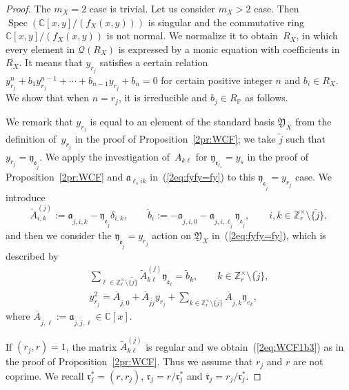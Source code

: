 \documentclass[10pt,a4paper]{amsart}
\def\CC{{\mathbb C}}
\def\ZZ{{\mathbb Z}}
\def\PP{{\mathbb P}}
\def\cQ{{\mathcal Q}}
\def\fY{{\mathfrak Y}}
\def\fa{{\mathfrak a}}
\def\fe{{\mathfrak e}}
\def\fr{{\mathfrak r}}
\def\fy{{\mathfrak y}}
\def\tA{{\widetilde A}}
\def\tb{{\widetilde b}}
\def\tj{{\widetilde j}}
\def\BA{{\overline A}}
\def\Bfr{{\overline{\mathfrak r}}}
\def\Spec{\operatorname{Spec}}
\numberwithin{equation}{section}
\begin{document}
\begin{proof}The $m_X=2$ case is trivial.
Let us consider $m_X>2$ case. Then $\Spec(\CC[x,y]/(f_X(x,y)))$ is singular and the commutative ring $\CC[x,y]/(f_X(x,y))$ is not normal.
We normalize it to obtain~$R_X$, in which every element in $\cQ(R_X)$ is expressed by a monic equation with coefficients in $R_X$.
It means that $y_{r_j}$ satisfies a certain relation $y_{r_j}^n+b_1 y_{r_j}^{n-1}+\cdots+b_{n-1} y_{r_j} + b_n=0$ for certain positive integer $n$ and $b_i \in R_X$.
We show that when $n=r_j$, it is irreducible and $b_j \in R_\PP$ as follows.

We remark that $y_{r_j}$ is equal to an element of the standard basis $\fY_X$ from the definition of~$y_{r_j}$ in the proof of Proposition~\ref{2pr:WCF};
we take $\tj$ such that $y_{r_j}=\fy_{\fe_{\tj}}$.
We apply the investigation of~$A_{k\ell}$ for $\fy_{\fe_{\ell_s}}=y_s$ in the proof of Proposition~\ref{2pr:WCF} and $\fa_{\ell_s i k}$ in~(\ref{2eq:fyfy=fy}) to this $\fy_{\fe_{\tj}}=y_{r_j}$ case.
We introduce
\begin{equation*}
\tA^{(j)}_{i,k}:=\fa_{\tj, i, k}-\fy_{\fe_\tj}\delta_{i,k}, \qquad
\tb_i:=-\fa_{\tj,i,0}-\fa_{\tj,i,\ell_\tj}\fy_{\fe_{\tj}}, \qquad
i, k \in \ZZ_r^\times\setminus\big\{\tj\big\},%
\end{equation*}
and then we consider the $\fy_{\fe_{\tj}}=y_{r_j}$ action on $\fY_X$ in~(\ref{2eq:fyfy=fy}), which is described by{\samepage
\begin{gather}
\sum_{\ell \in \ZZ_r^\times\setminus\{\tj \}} \tA^{(j)}_{k\ell}\fy_{\fe_\ell}=\tb_k,
\qquad k \in \ZZ_r^\times \setminus\big\{\tj\big\},\label{2eq:Aeta_b02}
\\
y_{r_j}^2= \BA_{\tj,0}+\BA_{\tj\tj}y_{r_j}+
\sum_{k \in \ZZ_r^\times\setminus\{\tj \}} \BA_{\tj,k} \fy_{e_k},\label{2eq:Aeta_b02a}
\end{gather}
where $\BA_{\tj,\ell}:=\fa_{\tj, \tj, \ell}\in \CC[x]$.}

If $(r_j, r)=1$, the matrix $\tA^{(j)}_{k\ell}$ is regular and we obtain~(\ref{2eq:WCF1b3}) as in the proof of Proposition~\ref{2pr:WCF}.
Thus we assume that $r_j$ and $r$ are not coprime.
We recall $\fr_j^*=(r, r_j)$, $\fr_j=r/\fr_j^*$ and $\Bfr_j=r_j/\fr_j^*$.


\end{proof}
\end{document}
